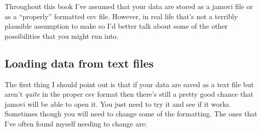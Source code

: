 Throughout this book I've assumed that your data are stored as a jamovi  file or as a ``properly'' formatted csv file. However, in real life that's not a terribly plausible assumption to make so I'd better talk about some of the other possibilities that you might run into. 


\subsection{Loading data from text files} 

The first thing I should point out is that if your data are saved as a text file but aren't {\it quite} in the proper csv format then there's still a pretty good chance that jamovi will be able to open it. You just need to try it and see if it works. Sometimes though you will need to change some of the formatting. The ones that I've often found myself needing to change are:

